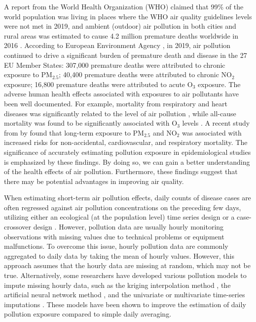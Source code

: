 \documentclass[
  12,
]{article}
\begin{document}
A report from the World Health Organization (WHO) claimed that 99\% of
the world population was living in places where the WHO air quality
guidelines levels were not met in 2019, and ambient (outdoor) air
pollution in both cities and rural areas was estimated to cause 4.2
million premature deaths worldwide in 2016 \autocite{WHO2021}. According
to European Environment Agency \autocite{EEA2021}, in 2019, air
pollution continued to drive a significant burden of premature death and
disease in the 27 EU Member States: 307,000 premature deaths were
attributed to chronic exposure to PM\(_{2.5}\); 40,400 premature deaths
were attributed to chronic NO\(_2\) exposure; 16,800 premature deaths
were attributed to acute O\(_3\) exposure. The adverse human health
effects associated with exposures to air pollutants have been well
documented. For example, mortality from respiratory and heart diseases
was significantly related to the level of air pollution \autocites[see
e.g.,][]{Hoek2013,Hodgson1970}, while all-cause mortality was found to
be significantly associated with O\(_3\) levels \autocites[see
e.g.,][]{Huang2022,Anderson1996}. A recent study from by
\textcite{Zhang2021} found that long-term exposure to PM\(_{2.5}\) and
NO\(_2\) was associated with increased risks for non-accidental,
cardiovascular, and respiratory mortality. The significance of
accurately estimating pollution exposure in epidemiological studies is
emphasized by these findings. By doing so, we can gain a better
understanding of the health effects of air pollution. Furthermore, these
findings suggest that there may be potential advantages in improving air
quality.

When estimating short-term air pollution effects, daily counts of
disease cases are often regressed against air pollution concentrations
on the preceding few days, utilizing either an ecological (at the
population level) time series design \autocites[see
e.g.,][]{Zhou2021,Krall2013,Gouveia2000} or a case-crossover design
\autocites[see e.g.,][]{Lavigne2022,Liu2019,Di2017,Wing2017}. However,
pollution data are usually hourly monitoring observations with missing
values due to technical problems or equipment malfunctions. To overcome
this issue, hourly pollution data are commonly aggregated to daily data
by taking the mean of hourly values. However, this approach assumes that
the hourly data are missing at random, which may not be true.
Alternatively, some researchers have developed various pollution models
to impute missing hourly data, such as the kriging interpolation method
\autocite{Cressie1993}, the artificial neural network method
\autocite[see e.g.,][]{Cordova2021}, and the univariate or multivariate
time-series imputations \autocite{Hadeed2020}. These models have been
shown to improve the estimation of daily pollution exposure compared to
simple daily averaging.
\end{document}
